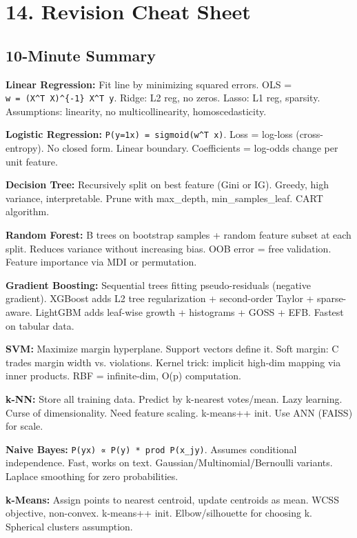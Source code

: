 \documentclass[11pt]{article}
\begin{document}
\section{14. Revision Cheat Sheet}\label{14-revision-cheat-sheet}

\subsection{10-Minute Summary}\label{10-minute-summary}

\textbf{Linear Regression:} Fit line by minimizing squared errors. OLS = \texttt{w\ =\ (X\^{}T\ X)\^{}\{-1\}\ X\^{}T\ y}. Ridge: L2 reg, no zeros. Lasso: L1 reg, sparsity. Assumptions: linearity, no multicollinearity, homoscedasticity.

\textbf{Logistic Regression:} \texttt{P(y=1\textbar{}x)\ =\ sigmoid(w\^{}T\ x)}. Loss = log-loss (cross-entropy). No closed form. Linear boundary. Coefficients = log-odds change per unit feature.

\textbf{Decision Tree:} Recursively split on best feature (Gini or IG). Greedy, high variance, interpretable. Prune with max\_depth, min\_samples\_leaf. CART algorithm.

\textbf{Random Forest:} B trees on bootstrap samples + random feature subset at each split. Reduces variance without increasing bias. OOB error = free validation. Feature importance via MDI or permutation.

\textbf{Gradient Boosting:} Sequential trees fitting pseudo-residuals (negative gradient). XGBoost adds L2 tree regularization + second-order Taylor + sparse-aware. LightGBM adds leaf-wise growth + histograms + GOSS + EFB. Fastest on tabular data.

\textbf{SVM:} Maximize margin hyperplane. Support vectors define it. Soft margin: C trades margin width vs. violations. Kernel trick: implicit high-dim mapping via inner products. RBF = infinite-dim, O(p) computation.

\textbf{k-NN:} Store all training data. Predict by k-nearest votes/mean. Lazy learning. Curse of dimensionality. Need feature scaling. k-means++ init. Use ANN (FAISS) for scale.

\textbf{Naive Bayes:} \texttt{P(y\textbar{}x)\ ∝\ P(y)\ *\ prod\ P(x\_j\textbar{}y)}. Assumes conditional independence. Fast, works on text. Gaussian/Multinomial/Bernoulli variants. Laplace smoothing for zero probabilities.

\textbf{k-Means:} Assign points to nearest centroid, update centroids as mean. WCSS objective, non-convex. k-means++ init. Elbow/silhouette for choosing k. Spherical clusters assumption.
\end{document}
